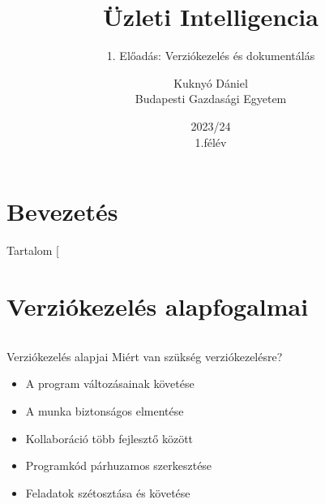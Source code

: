\documentclass[english, aspectratio=169]{beamer}
\makeatletter
\newcommand\makebeamertitle{\frame{\maketitle}}
\let\origtableofcontents=\tableofcontents
\def\tableofcontents{\@ifnextchar[{\origtableofcontents}{\gobbletableofcontents}}
\def\gobbletableofcontents#1{\origtableofcontents}
\makeatother
\begin{document}
\section{Bevezetés}
\title[]{Üzleti Intelligencia}
\subtitle{1. Előadás: Verziókezelés és dokumentálás}
\author[Kuknyó Dániel]{Kuknyó Dániel\\Budapesti Gazdasági Egyetem}
\date{2023/24\\1.félév}
\makebeamertitle

\begin{frame}{Tartalom}
\tableofcontents{}
\end{frame}

\section{Verziókezelés alapfogalmai}

\begin{columns}

\begin{column}{0.5\textwidth}
\begin{frame}{Verziókezelés alapjai}
	Miért van szükség verziókezelésre?
	\begin{itemize}
		\item A program változásainak követése
		\item A munka biztonságos elmentése
		\item Kollaboráció több fejlesztő között
		\item Programkód párhuzamos szerkesztése
		\item Feladatok szétosztása és követése
	\end{itemize}
\end{frame}
\end{column}

\begin{column}{0.5\textwidth}
	
\end{column}

\end{columns}
\end{document}
